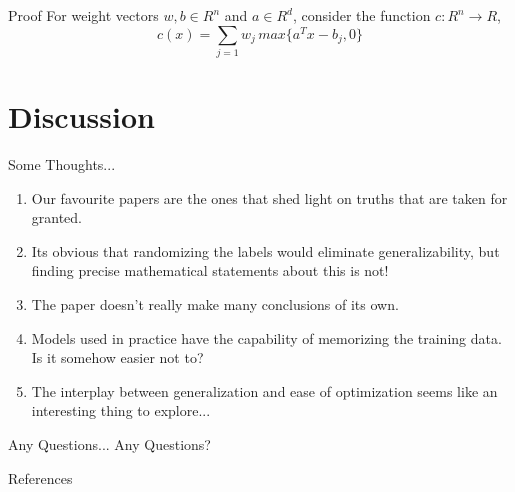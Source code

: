 \documentclass[10pt]{beamer}
\begin{document}
\begin{frame}{Proof}
For weight vectors $w, b \in R^n$ and $a \in R^d$, consider the function $c : R^n \to R$,
\[c(x) =\sum \limits_{j=1}w_j\, max\{a^Tx - b_j , 0\}\]

\end{frame}	
\section{Discussion}

\begin{frame}{Some Thoughts... }
	\begin{enumerate}
		\item Our favourite papers are the ones that shed light on truths that are taken for granted.
		\item Its obvious that randomizing the labels would eliminate generalizability, but finding precise mathematical statements about this is not!
		\item The paper doesn't really make many conclusions of its own.
		\item Models used in practice have the capability of memorizing the training data. Is it somehow easier not to?
		\item The interplay between generalization and ease of optimization seems like an interesting thing to explore...
	\end{enumerate}

	
	
\end{frame}	

\begin{frame}{Any Questions... }
Any Questions?
\end{frame}	

\begin{frame}{References}


\end{frame}	
	
\end{document}
